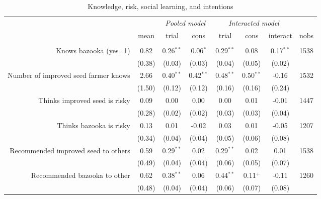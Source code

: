 \documentclass[english]{article}\usepackage[]{graphicx}\usepackage[]{xcolor}
\begin{document}
\begin{sidewaystable}
\caption{Knowledge, risk, social learning, and intentions\label{pathways}}

\footnotesize
\begin{center}
\begin{tabular}{rccccccc}
\hline\hline
& & \multicolumn{2}{c}{\textit{Pooled model}} & \multicolumn{3}{c}{\textit{Interacted model}} \\
& mean & trial & cons & trial & cons & interact & nobs \\
\hline
\\
Knows bazooka (yes=1)
& 0.82
& 0.26$^{**}$
& 0.06$^{*}$ 
& 0.29$^{**}$ 
& 0.08$^{}$
& 0.17$^{**}$ & 1538 \\

& (0.38) & (0.03)  & (0.03) & (0.04)  & (0.05)  & (0.02)
 \\

Number of improved seed farmer knows
& 2.66
& 0.40$^{**}$
& 0.42$^{**}$ 
& 0.48$^{**}$ 
& 0.50$^{**}$
& -0.16$^{}$ & 1532 \\

& (1.50) & (0.12)  & (0.12) & (0.16)  & (0.16)  & (0.24)
 \\

Thinks improved seed is risky
& 0.09
& 0.00$^{}$
& 0.00$^{}$ 
& 0.00$^{}$ 
& 0.01$^{}$
& -0.01$^{}$ & 1447 \\

& (0.28) & (0.02)  & (0.02) & (0.03)  & (0.03)  & (0.04)
 \\

Thinks bazooka is risky
& 0.13
& 0.01$^{}$
& -0.02$^{}$ 
& 0.03$^{}$ 
& 0.01$^{}$
& -0.05$^{}$ & 1207 \\

& (0.34) & (0.04)  & (0.04) & (0.05)  & (0.06)  & (0.08)
 \\

Recommended improved seed to others
& 0.59
& 0.29$^{**}$
& 0.02$^{}$ 
& 0.29$^{**}$ 
& 0.02$^{}$
& 0.01$^{}$ & 1538 \\

& (0.49) & (0.04)  & (0.04) & (0.06)  & (0.05)  & (0.07)
 \\

Recommended bazooka to other
& 0.62
& 0.38$^{**}$
& 0.06$^{}$ 
& 0.44$^{**}$ 
& 0.11$^{+}$
& -0.11$^{}$ & 1260 \\

& (0.48) & (0.04)  & (0.04) & (0.06)  & (0.07)  & (0.08)
 \\


\end{tabular}
\end{center}
\end{sidewaystable}
\end{document}

